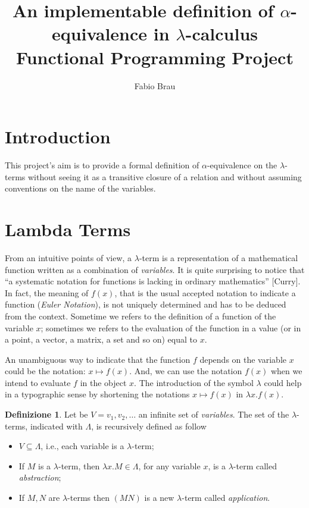 \documentclass[a4paper,11pt]{article}
\title{An implementable definition of $\alpha$-equivalence in
$\lambda$-calculus\\
{\large Functional Programming Project}}
\author{Fabio Brau}
\theoremstyle{definition}
\newtheorem{defn}{Definizione}
\begin{document}
\maketitle
\tableofcontents
\section{Introduction}


This project's aim is to provide a formal definition of $\alpha$-equivalence
on the $\lambda$-terms without seeing it as a transitive closure of a
relation and without assuming conventions on the name of the variables.


\section{Lambda Terms}
From an intuitive points of view, a $\lambda$-term is a representation of
a mathematical function written as a combination of \textit{variables}. It
is quite surprising to notice that ``a systematic notation for functions is lacking
in ordinary mathematics'' [Curry]. In fact, the meaning of $f(x)$, that is the usual
accepted notation to indicate a function (\textit{Euler Notation}), is not uniquely
determined and has to be deduced from the context. Sometime we refers to the
definition of  a function of the variable $x$; sometimes we refers to the
evaluation of the function in a value (or in a point, a vector, a matrix, a
set and so on) equal to $x$.

An unambiguous way to indicate that the function $f$ depends on the variable $x$ 
could be the notation: $x\mapsto f(x)$. And, we can use the notation $f(x)$
when we intend to evaluate $f$ in the object $x$. The introduction of the
symbol $\lambda$ could help in a typographic sense by shortening the
notations $x\mapsto f(x)$ in $\lambda x.f(x)$.

\begin{defn}
  Let be $V={v_1,v_2,\dots}$ an infinite set of \textit{variables}. The
  set of the $\lambda$-terms, indicated with $\Lambda$, is recursively
  defined as follow
  \begin{itemize}
    \item $V\subseteq\Lambda$, i.e., each variable is a $\lambda$-term;
    \item If $M$ is a $\lambda$-term, then $\lambda x.M\in\Lambda$, for any variable
      $x$, is a $\lambda$-term called \textit{abstraction};
    \item If $M,N$ are $\lambda$-terms then $(MN)$ is a new $\lambda$-term
      called \textit{application}.
  \end{itemize}
\end{defn}
\end{document}
